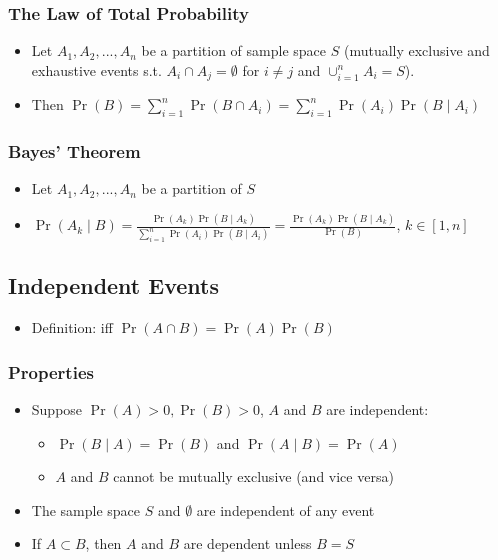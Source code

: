 \documentclass[10pt]{article}
\begin{document}
\subsubsection*{The Law of Total Probability}
\begin{itemize}
    \item Let $A_1,A_2,...,A_n$ be a partition of sample space $S$ (mutually exclusive and exhaustive events s.t. $A_i\cap A_j = \emptyset$ for $i\neq j$ and $\cup_{i=1}^n A_i = S$).
    \item Then $\Pr(B) = \sum_{i=1}^{n}\Pr(B\cap A_i) = \sum_{i=1}^{n}\Pr(A_i)\Pr(B\mid A_i)$
\end{itemize}
\subsubsection*{Bayes' Theorem}
\begin{itemize}
    \item Let $A_1,A_2,...,A_n$ be a partition of $S$
    \item $\Pr(A_k\mid B) = \frac{\Pr(A_k)\Pr(B\mid A_k)}{\sum_{i=1}^{n}\Pr(A_i)\Pr(B\mid A_i)} = \frac{\Pr(A_k)\Pr(B\mid A_k)}{\Pr(B)}$, $k \in [1, n]$
\end{itemize}

\subsection*{Independent Events}
\begin{itemize}
    \item Definition: iff $\Pr(A\cap B) = \Pr(A)\Pr(B)$
\end{itemize}
\subsubsection*{Properties}
\begin{itemize}
    \item Suppose $\Pr(A)>0,\Pr(B)>0$, $A$ and $B$ are independent:
          \begin{itemize}
              \item $\Pr(B\mid A) = \Pr(B)$ and $\Pr(A\mid B) = \Pr(A)$
              \item $A$ and $B$ cannot be mutually exclusive (and vice versa)
          \end{itemize}
    \item The sample space $S$ and $\emptyset$ are independent of any event
    \item If $A \subset B$, then $A$ and $B$ are dependent unless $B = S$
\end{itemize}
\end{document}
